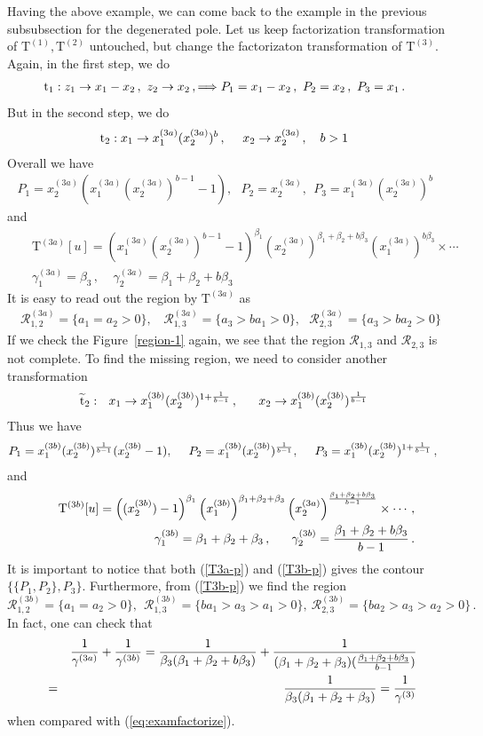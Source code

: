 \documentclass[a4paper,11pt]{article}
\newcommand{\nT}{\mathrm{T}}
\newcommand{\bea}{\begin{eqnarray}}
\newcommand{\eea}{\end{eqnarray}}
\newcommand{\nnn}{\nonumber\\}
\def\eref#1{(\ref{#1})}
\begin{document}
Having the above example, we can come back to the example in the previous subsubsection for the degenerated pole. Let us keep 
factorization transformation of $\nT^{(1)}, \nT^{(2)}$ untouched, but change the factorizaton transformation of $\nT^{(3)}$. Again, in the first step, we do 
\begin{align}
	&{\text t}_1: z_1\to x_1-x_2\,, \ z_2\to x_2\, , \Longrightarrow 
	P_1=x_1-x_2\,,\ P_2=x_2\,,\  P_3=x_1\,.
\end{align}
But in the second step, we do 
\begin{align}
	&{\text t}_2: x_1\to x_1^{(3a)}(x_2^{(3a)})^b\,, ~~~\ x_2\to x_2^{(3a)}\, ,~~~b>1
\end{align}
Overall we have 
%
\bea  P_1=x_2^{(3a)}(x_1^{(3a)}(x_2^{(3a)})^{b-1}-1),~~~P_2=x_2^{(3a)},~~P_3=x_1^{(3a)} (x_2^{(3a)})^b~~~~\label{T3a-p}\eea
%
and
%
\bea & & \nT^{(3a)}[u] = \left(x_1^{(3a)}(x_2^{(3a)})^{b-1}-1\right)^{\beta
	_1}  \left(x_2^{(3a)} \right)^{\beta_1 + \beta _2 +b \beta_3} 
\left(x_1^{(3a)}\right)^{b\beta _3}  \times \cdots  \nnn
&&\gamma^{(3a)}_1=\beta_3 \,,\ ~~~~\gamma^{(3a)}_2=\beta_1+\beta_2+b\beta_3 \eea
%
It is easy to read out the region by $\nT^{(3a)}$ as 
%
\bea \mathcal{R}^{(3a)}_{1,2} = \{a_1=a_2>0\},~~~~\mathcal{R}^{(3a)}_{1,3} = \{a_3>ba_1>0\},~~~
\mathcal{R}^{(3a)}_{2,3} = \{a_3>b a_2>0\}\eea
%
If we check the Figure~\ref{region-1} again, we see that the region $\mathcal{R}_{1,3}$ and $\mathcal{R}_{2,3}$
is not complete. To find the missing region,  we need to consider another transformation
\bea
	&\widetilde{ {\text t}}_2:~~ x_1\to x_1^{(3b)}(x_2^{(3b)})^{1+{1\over b-1}}\,,~~~~ \ x_2\to x_1^{(3b)}(x_2^{(3b)})^{{1\over b-1}}\, 
\eea
Thus we have 
%
\bea P_1=x_1^{(3b)}(x_2^{(3b)})^{{1\over b-1}}(x_2^{(3b)}-1),~~~~P_2=x_1^{(3b)}(x_2^{(3b)})^{{1\over b-1}},~~~~P_3=x_1^{(3b)}(x_2^{(3b)})^{1+{1\over b-1}} \, , ~~~~\label{T3b-p}\eea
%
and 
%
\bea & & \nT^{(3b)}[u] = \left((x_2^{(3b)})-1\right)^{\beta
	_1}  \left(x_1^{(3b)} \right)^{\beta_1 + \beta _2 + \beta_3} 
\left(x_2^{(3a)}\right)^{\beta_1+\beta_2+b\beta_3\over b-1}  \times \cdots \,,  \nnn
&&\gamma^{(3b)}_1=\beta_1 + \beta _2 + \beta_3\,,\ ~~~~\gamma^{(3b)}_2={\beta_1+\beta_2+b\beta_3\over b-1}  \, . \eea
%
It is important to notice that both \eref{T3a-p} and \eref{T3b-p} gives the contour $\{ \{P_1,P_2\}, P_3\}$. Furthermore, from \eref{T3b-p} we find the region
%
\begin{equation}
\mathcal{R}^{(3b)}_{1,2} = \{a_1=a_2>0\},~~\mathcal{R}^{(3b)}_{1,3} = \{ba_1>a_3>a_1>0\},~
\mathcal{R}^{(3b)}_{2,3} = \{ba_2>a_3>a_2>0\} \, . 
\end{equation}
%
In fact, one can check that 
%
\bea & & {1\over \gamma^{(3a)}}+{1\over \gamma^{(3b)}}={1\over \beta_3(\beta_1+\beta_2+b\beta_3)}+{1\over (\beta_1 + \beta _2 + \beta_3)({\beta_1+\beta_2+b\beta_3\over b-1})}\nnn
%
& = & {1\over \beta_3(\beta_1+\beta_2+\beta_3)}={1\over \gamma^{(3)}}\eea
%
when compared with \eref{eq:examfactorize}.
\end{document}
